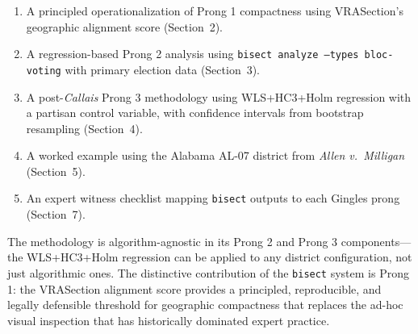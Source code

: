 \begin{enumerate}
  \item A principled operationalization of Prong 1 compactness using
    VRASection's geographic alignment score (Section~2).
  \item A regression-based Prong 2 analysis using \texttt{bisect analyze
    --types bloc-voting} with primary election data (Section~3).
  \item A post-\textit{Callais} Prong 3 methodology using WLS+HC3+Holm
    regression with a partisan control variable, with confidence intervals
    from bootstrap resampling (Section~4).
  \item A worked example using the Alabama AL-07 district from
    \textit{Allen v.\ Milligan} (Section~5).
  \item An expert witness checklist mapping \texttt{bisect} outputs to each
    Gingles prong (Section~7).
\end{enumerate}

The methodology is algorithm-agnostic in its Prong 2 and Prong 3
components---the WLS+HC3+Holm regression can be applied to any district
configuration, not just algorithmic ones.  The distinctive contribution of
the \texttt{bisect} system is Prong 1: the VRASection alignment score provides
a principled, reproducible, and legally defensible threshold for geographic
compactness that replaces the ad-hoc visual inspection that has historically
dominated expert practice.
